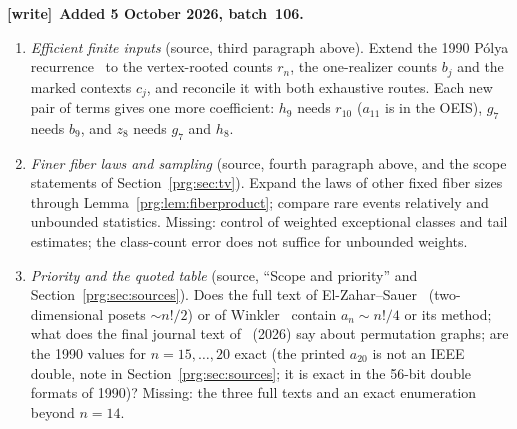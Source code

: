 \documentclass[11pt,letterpaper]{article}
\numberwithin{equation}{section}
\theoremstyle{definition}\newtheorem{definition}[theorem]{Definition}
\theoremstyle{remark}\newtheorem{remark}[theorem]{Remark}
\newenvironment{writenote}[1][]{\par\smallskip\begingroup\small
 \noindent\textbf{[write]}\if\relax\detokenize{#1}\relax\else~\textbf{#1.}\fi\ }%
 {\par\endgroup\smallskip}
\begin{document}
\begin{writenote}[Added 5 October 2026, batch~106]
\begin{enumerate}
 optimal truncation, Borel summation or a description of the exponentially
 small sectors is justified. Missing: every estimate uniform in $R$.
\item\label{prg:q:recurrence} \emph{Efficient finite inputs} (source, third
 paragraph above). Extend the 1990 P\'olya recurrence~\cite{BEK} to the
 vertex-rooted counts $r_n$, the one-realizer counts $b_j$ and the marked
 contexts $c_j$, and reconcile it with both exhaustive routes. Each new pair
 of terms gives one more coefficient: $h_9$ needs $r_{10}$ ($a_{11}$ is in
 the OEIS), $g_7$ needs $b_9$, and $z_8$ needs $g_7$ and $h_8$.
\item\label{prg:q:fibers} \emph{Finer fiber laws and sampling} (source,
 fourth paragraph above, and the scope statements of
 Section~\ref{prg:sec:tv}). Expand the laws of other fixed fiber sizes
 through Lemma~\ref{prg:lem:fiberproduct}; compare rare events relatively and
 unbounded statistics. Missing: control of weighted exceptional classes and
 tail estimates; the class-count error does not suffice for unbounded
 weights.
\item\label{prg:q:priority} \emph{Priority and the quoted table} (source,
 ``Scope and priority'' and Section~\ref{prg:sec:sources}). Does the full
 text of El-Zahar--Sauer~\cite{ES} (two-dimensional posets $\sim n!/2$) or of
 Winkler~\cite{Winkler} contain $a_n\sim n!/4$ or its method; what does the
 final journal text of~\cite{BBFGP} (2026) say about permutation graphs; are
 the 1990 values for $n=15,\dots,20$ exact (the printed $a_{20}$ is not an
 IEEE double, note in Section~\ref{prg:sec:sources}; it is exact in the
 56-bit double formats of 1990)? Missing: the three full
 texts and an exact enumeration beyond $n=14$.
\end{enumerate}
\end{writenote}
\end{document}
